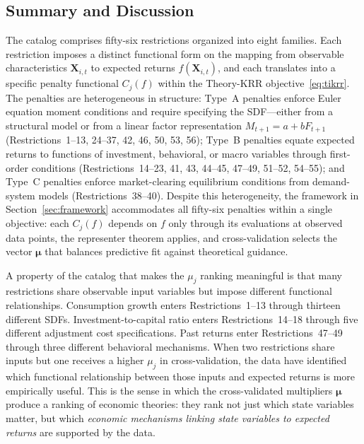 \subsection{Summary and Discussion}\label{sub:restriction_summary}

The catalog comprises fifty-six restrictions organized into eight families.
Each restriction imposes a distinct functional form on the mapping from observable characteristics $\mathbf{X}_{i,t}$ to expected returns $f(\mathbf{X}_{i,t})$, and each translates into a specific penalty functional $C_j(f)$ within the Theory-KRR objective~\eqref{eq:tikrr}.
The penalties are heterogeneous in structure: Type~A penalties enforce Euler equation moment conditions and require specifying the SDF---either from a structural model or from a linear factor representation $M_{t+1} = a + b F_{t+1}$ (Restrictions~1--13, 24--37, 42, 46, 50, 53, 56); Type~B penalties equate expected returns to functions of investment, behavioral, or macro variables through first-order conditions (Restrictions~14--23, 41, 43, 44--45, 47--49, 51--52, 54--55); and Type~C penalties enforce market-clearing equilibrium conditions from demand-system models (Restrictions~38--40).
Despite this heterogeneity, the framework in Section~\ref{sec:framework} accommodates all fifty-six penalties within a single objective: each $C_j(f)$ depends on $f$ only through its evaluations at observed data points, the representer theorem applies, and cross-validation selects the vector $\bm{\mu}$ that balances predictive fit against theoretical guidance.

A property of the catalog that makes the $\mu_j$ ranking meaningful is that many restrictions share observable input variables but impose different functional relationships.
Consumption growth enters Restrictions~1--13 through thirteen different SDFs.
Investment-to-capital ratio enters Restrictions~14--18 through five different adjustment cost specifications.
Past returns enter Restrictions~47--49 through three different behavioral mechanisms.
When two restrictions share inputs but one receives a higher $\mu_j$ in cross-validation, the data have identified which functional relationship between those inputs and expected returns is more empirically useful.
This is the sense in which the cross-validated multipliers $\bm{\mu}$ produce a ranking of economic theories: they rank not just which state variables matter, but which \emph{economic mechanisms linking state variables to expected returns} are supported by the data.
